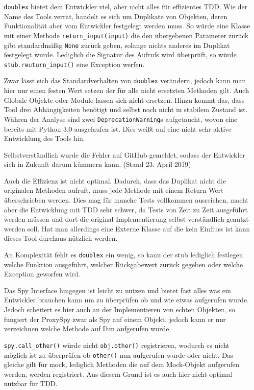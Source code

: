 \lstinline{doublex} bietet dem Entwickler viel, aber nicht alles für effizientes
TDD. Wie der Name des Tools verrät, handelt es sich um Duplikate von Objekten,
deren Funktionalität aber vom Entwickler festgelegt werden muss. So würde eine
Klasse mit einer Methode \lstinline{return_input(input)} die den übergebenen
Parameter zurück gibt standardmäßig \lstinline{None} zurück geben, solange
nichts anderes im Duplikat festgelegt wurde. Lediglich die Signatur des Aufrufs
wird überprüft, so würde \lstinline{stub.reuturn_input()} eine Exception
werfen.

Zwar lässt sich das Standardverhalten von \lstinline{doublex} verändern, jedoch
kann man hier nur einen festen Wert setzen der für alle nicht ersetzten Methoden
gilt. Auch Globale Objekte oder Module lassen sich nicht ersetzen. Hinzu kommt
das, dass Tool drei Abhängigkeiten benötigt und selbst noch nicht in stabilem
Zustand ist. Währen der Analyse sind zwei \lstinline{DeprecationWarning}s
aufgetaucht, wovon eine bereits mit Python 3.0 ausgelaufen ist. Dies weißt auf
eine nicht sehr aktive Entwicklung des Tools hin.

Selbstverständlich wurde die Fehler auf GitHub gemeldet, sodass der Entwickler
sich in Zukunft darum kümmern kann. (Stand 23. April 2019)

Auch die Effizienz ist nicht optimal. Dadurch, dass das Duplikat nicht die
originalen Methoden aufruft, muss jede Methode mit einem Return Wert
überschrieben werden. Dies mag für manche Tests vollkommen ausreichen, macht
aber die Entwicklung mit TDD sehr schwer, da Tests von Zeit zu Zeit ausgeführt
werden müssen und dort die original Implementierung selbst verständlich genutzt
werden soll. Hat man allerdings eine Externe Klasse auf die kein Einfluss ist
kann dieses Tool durchaus nützlich werden.

An Komplexität fehlt es \lstinline{doublex} ein wenig, so kann der \Gls{stub}
lediglich festlegen welche Funktion ausgeführt, welcher Rückgabewert zurück
gegeben oder welche Exception geworfen wird.

Das Spy Interface hingegen ist leicht zu nutzen und bietet fast alles was ein
Entwickler brauchen kann um zu überprüfen ob und wie etwas aufgerufen wurde.
Jedoch scheitert es hier auch an der Implementieren von echten Objekten, so
fungiert der ProxySpy zwar als Spy auf einem Objekt, jedoch kann er nur
verzeichnen welche Methode auf Ihm aufgerufen wurde.

\lstinline{spy.call_other()} würde nicht \lstinline{obj.other()} registrieren,
wodurch es nicht möglich ist zu überprüfen ob \lstinline{other()} nun aufgerufen
wurde oder nicht. Das gleiche gilt für \Gls{mock}, lediglich Methoden die auf
dem Mock-Objekt aufgerufen werden, werden registriert. Aus diesem Grund ist es
auch hier nicht optimal nutzbar für TDD.